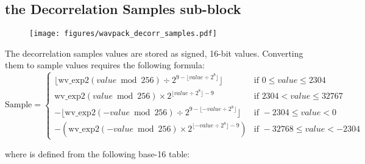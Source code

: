 \subsection{the Decorrelation Samples sub-block}
\label{wavpack_decorr_samples}
\begin{figure}[h]
\texttt{[image: figures/wavpack\_decorr\_samples.pdf]}
\end{figure}
\par
\noindent
The decorrelation samples values are stored as signed, 16-bit values.
Converting them to sample values requires the following formula:
\begin{equation*}
\text{Sample} =
\begin{cases}
\lfloor \text{wv\_exp2}(value \bmod{256}) \div 2 ^ {9 - \lfloor value \div 2 ^ 8 \rfloor} \rfloor & \text{if } 0 \leq value \leq 2304 \\
\text{wv\_exp2}(value \bmod{256}) \times 2 ^ {\lfloor value \div 2 ^ 8 \rfloor - 9} & \text{if } 2304 < value \leq 32767 \\
-\lfloor \text{wv\_exp2}(-value \bmod{256}) \div 2 ^ {9 - \lfloor -value \div 2 ^ 8 \rfloor} \rfloor & \text{if } -2304 \leq value < 0 \\
-(\text{wv\_exp2}(-value \bmod{256}) \times 2 ^ {\lfloor -value \div 2 ^ 8 \rfloor - 9}) & \text{if } -32768 \leq value < -2304
\end{cases}
\end{equation*}
\par
\noindent
where  is defined from the following base-16 table:
\par
\noindent
